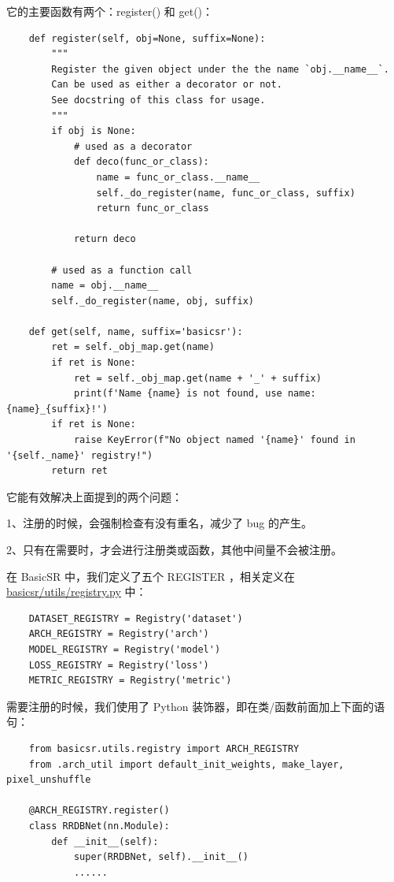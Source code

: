 \documentclass[../main.tex]{subfiles}
\begin{document}
    它的主要函数有两个：register() 和 get()：
    \begin{verbatim}
    def register(self, obj=None, suffix=None):
        """
        Register the given object under the the name `obj.__name__`.
        Can be used as either a decorator or not.
        See docstring of this class for usage.
        """
        if obj is None:
            # used as a decorator
            def deco(func_or_class):
                name = func_or_class.__name__
                self._do_register(name, func_or_class, suffix)
                return func_or_class

            return deco

        # used as a function call
        name = obj.__name__
        self._do_register(name, obj, suffix)

    def get(self, name, suffix='basicsr'):
        ret = self._obj_map.get(name)
        if ret is None:
            ret = self._obj_map.get(name + '_' + suffix)
            print(f'Name {name} is not found, use name: {name}_{suffix}!')
        if ret is None:
            raise KeyError(f"No object named '{name}' found in '{self._name}' registry!")
        return ret
    \end{verbatim}

    它能有效解决上面提到的两个问题：

    1、注册的时候，会强制检查有没有重名，减少了 bug 的产生。

    2、只有在需要时，才会进行注册类或函数，其他中间量不会被注册。

    在 BasicSR 中，我们定义了五个 REGISTER ，相关定义在 \href{https://github.com/XPixelGroup/BasicSR/blob/master/basicsr/utils/registry.py}{basicsr/utils/registry.py} 中：
    \begin{verbatim}
    DATASET_REGISTRY = Registry('dataset')
    ARCH_REGISTRY = Registry('arch')
    MODEL_REGISTRY = Registry('model')
    LOSS_REGISTRY = Registry('loss')
    METRIC_REGISTRY = Registry('metric')
    \end{verbatim}

    需要注册的时候，我们使用了 Python 装饰器，即在类/函数前面加上下面的语句：
    \begin{verbatim}
    from basicsr.utils.registry import ARCH_REGISTRY
    from .arch_util import default_init_weights, make_layer, pixel_unshuffle

    @ARCH_REGISTRY.register()
    class RRDBNet(nn.Module):
        def __init__(self):
            super(RRDBNet, self).__init__()
            ......
    \end{verbatim}
\end{document}
